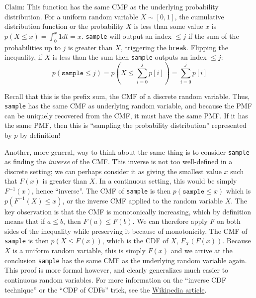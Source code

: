 \documentclass[11pt, oneside]{article}
\theoremstyle{plain}
\theoremstyle{definition}
\begin{document}
Claim: This function has the same CMF as the underlying probability
distribution. For a uniform random variable \( X \sim [0, 1] \), the
cumulative distribution function or the probability \( X \) is less
than some value \( x \) is \( p(X \leq x) = \int^x_0 1 dt = x \).
\texttt{sample} will output an index \( \leq j \) if the sum of the
probabilities up to \( j \) is greater than \( X \), triggering the
\texttt{break}. Flipping the inequality, if \( X \) is less
than the sum then \texttt{sample} outputs an index \( \leq j \):
\[ p(\texttt{sample} \leq j) = p(X \leq \sum^j_{i = 0}p[i]) =
   \sum^j_{i = 0} p[i] \] 

Recall that this is the prefix sum, the CMF of a discrete random variable.
Thus, \texttt{sample} has the same CMF as underlying random variable, and
because the PMF can be uniquely recovered from the CMF, it must have the same
PMF. If it has the same PMF, then this is \enquote{sampling the probability
distribution} represented by \( p \) by definition!

Another, more general, way to think about the same thing is to consider
\texttt{sample} as finding the \textit{inverse} of the CMF. This inverse is
not too well-defined in a discrete setting; we can perhaps consider it as
giving the smallest value \( x \) such that \( F(x) \) is greater than \(
X \). In a continuous setting, this would be simply \( F^{-1}(x) \), hence
\enquote{inverse}. The CMF of \texttt{sample} is then \( p(\texttt{sample} \leq
x) \) which is \( p(F^{-1}(X) \leq x) \), or the inverse CMF applied to the
random variable \( X \). The key observation is that the CMF is monotonically
increasing, which by definition means that if \( a \leq b \), then \( F(a) \leq
F(b) \). We can therefore apply \( F \) on both sides of the inequality while
preserving it because of monotonicity. The CMF of \texttt{sample} is then \(
p(X \leq F(x)) \), which is the CDF of \( X \), \( F_X(F(x)) \). Because \(
X \) is a uniform random variable, this is simply \( F(x) \) and we arrive
at the conclusion \texttt{sample} has the same CMF as the underlying random
variable again. This proof is more formal however, and clearly generalizes
much easier to continuous random variables. For more information on the
\enquote{inverse CDF technique} or the \enquote{CDF of CDFs} trick, see the
\href{https://en.wikipedia.org/wiki/Inverse_transform_sampling}
{Wikipedia article}.
\end{document}
